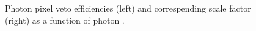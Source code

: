 \begin{figure}[htbp]
  \centering
  \caption{
    Photon pixel veto efficiencies (left) and correspending scale factor (right) as a function of photon \pt.
  }
  \label{fig:pvsf_results}
\end{figure}
